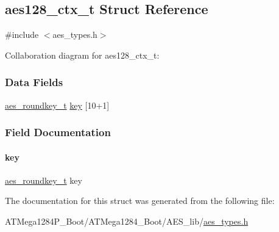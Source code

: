 \hypertarget{structaes128__ctx__t}{}\subsection{aes128\+\_\+ctx\+\_\+t Struct Reference}
\label{structaes128__ctx__t}


{\ttfamily \#include $<$aes\+\_\+types.\+h$>$}



Collaboration diagram for aes128\+\_\+ctx\+\_\+t\+:
\subsubsection*{Data Fields}
\begin{DoxyCompactItemize}
\item 
\hyperlink{structaes__roundkey__t}{aes\+\_\+roundkey\+\_\+t} \hyperlink{structaes128__ctx__t_a8d6c81feec0d82dff85187e3d7c22af5}{key} \mbox{[}10+1\mbox{]}
\end{DoxyCompactItemize}


\subsubsection{Field Documentation}
\mbox{\label{structaes128__ctx__t_a8d6c81feec0d82dff85187e3d7c22af5}} 
\paragraph{\texorpdfstring{key}{key}}
{\footnotesize\ttfamily \hyperlink{structaes__roundkey__t}{aes\+\_\+roundkey\+\_\+t} key}



The documentation for this struct was generated from the following file\+:\begin{DoxyCompactItemize}
\item 
A\+T\+Mega1284\+P\+\_\+\+Boot/\+A\+T\+Mega1284\+\_\+\+Boot/\+A\+E\+S\+\_\+lib/\hyperlink{_a_t_mega1284_p___boot_2_a_t_mega1284___boot_2_a_e_s__lib_2aes__types_8h}{aes\+\_\+types.\+h}\end{DoxyCompactItemize}
